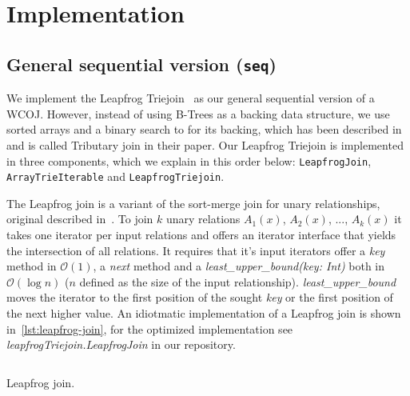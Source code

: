 \section{Implementation}\label{sec:implementation}

\subsection{General sequential version (\texttt{seq})}\label{subsec:general-sequential-versiontexttt}
We implement the Leapfrog Triejoin~\cite{leapfrog} as our general sequential version of a WCOJ.
However, instead of using B-Trees as a backing data structure, we use sorted arrays and a binary search
to for its backing, which has been described in~\cite{myria-detailed} and is called Tributary join in their paper.
Our Leapfrog Triejoin is implemented in three components, which we explain in this order below: \texttt{LeapfrogJoin}, \texttt{ArrayTrieIterable} and
\texttt{LeapfrogTriejoin}.

The Leapfrog join is a variant of the sort-merge join for unary relationships, original described in~\cite{leapfrog1,leapfrog2}. %
To join $k$ unary relations $A_1(x)$, $A_2(x)$, ..., $A_k(x)$ it takes one iterator per input relations and offers an iterator
interface that yields the intersection of all relations.
It requires that it's input iterators offer a \textit{key} method in $\mathcal{O}(1)$, a \textit{next} method and
a \textit{least\_upper\_bound(key: Int)} both in $\mathcal{O} (\log n)$ ($n$ defined as the size of the input relationship).
\textit{least\_upper\_bound} moves the iterator to the first position of the sought \textit{key} or the first position of the
next higher value.
An idiotmatic implementation of a Leapfrog join is shown in~\cref{lst:leapfrog-join}, for the optimized implementation see
\textit{leapfrogTriejoin.LeapfrogJoin} in our repository.  %

\begin{listing}[H]
    \inputminted{scala}{code/LeapfrogJoin.scala}
    \caption{Leapfrog join.}
    \label{lst:leapfrog-join}
\end{listing}






